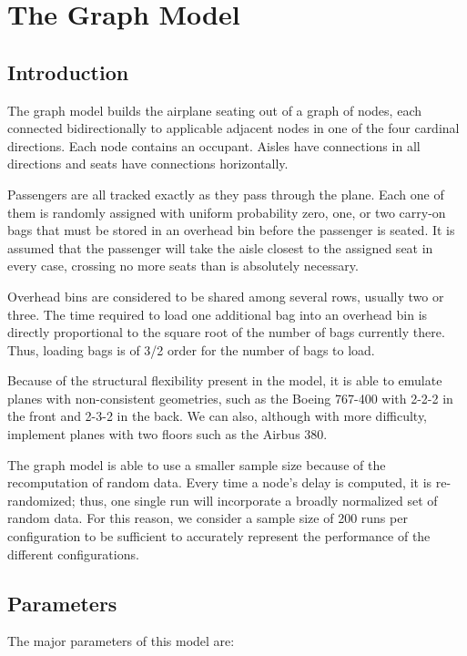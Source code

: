 \documentclass{article}
\begin{document}
\section{The Graph Model}
\subsection{Introduction}

The graph model builds the airplane seating out of a graph of nodes, each
connected bidirectionally to applicable adjacent nodes in one of the four
cardinal directions. Each node contains an occupant. Aisles have connections in
all directions and seats have connections horizontally.

Passengers are all tracked exactly as they pass through the plane. Each one of
them is randomly assigned with uniform probability zero, one, or two carry-on
bags that must be stored in an overhead bin before the passenger is seated. It
is assumed that the passenger will take the aisle closest to the assigned seat
in every case, crossing no more seats than is absolutely necessary.

Overhead bins are considered to be shared among several rows, usually two or
three. The time required to load one additional bag into an overhead bin is
directly proportional to the square root of the number of bags currently there.
Thus, loading bags is of 3/2 order for the number of bags to load.

Because of the structural flexibility present in the model, it is able to
emulate planes with non-consistent geometries, such as the Boeing 767-400 with
2-2-2 in the front and 2-3-2 in the back. We can also, although with more
difficulty, implement planes with two floors such as the Airbus 380.

The graph model is able to use a smaller sample size because of the
recomputation of random data. Every time a node's delay is computed, it is
re-randomized; thus, one single run will incorporate a broadly normalized set of
random data. For this reason, we consider a sample size of 200 runs per
configuration to be sufficient to accurately represent the performance of the
different configurations.

\subsection{Parameters}
The major parameters of this model are:
\end{document}
